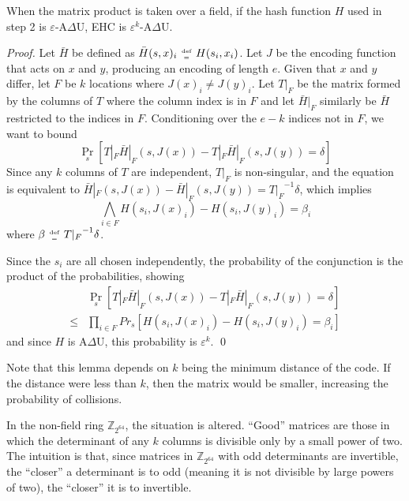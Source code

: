 \documentclass{llncs}
\newcommand{\ints}{\mathbb{Z}}
\newcommand{\defeq}{\;\genfrac{}{}{0pt}{2}{\text{def}}{=}\;}
\begin{document}
\begin{lemma}
  When the matrix product is taken over a field, if the hash function $H$ used in step 2 is $\varepsilon$-A$\Delta$U, EHC is $\varepsilon^k$-A$\Delta$U.
\end{lemma}
\begin{proof}
  Let $\bar{H}$ be defined as $\bar{H}(s, x)_i \defeq H(s_i, x_i)$.
  Let $J$ be the encoding function that acts on $x$ and $y$, producing an encoding of length $e$.
  Given that $x$ and $y$ differ, let $F$ be $k$ locations where $J(x)_i \neq J(y)_i$.
  Let $T|_F$ be the matrix formed by the columns of $T$ where the column index is in $F$ and let $\bar{H}|_F$ similarly be $\bar{H}$ restricted to the indices in $F$.
  Conditioning over the $e - k$ indices not in $F$, we want to bound
  \begin{equation}
    \label{ehc-delta}
    \Pr_s[T|_F \bar{H}|_F(s, J(x)) - T|_F \bar{H}|_F(s, J(y)) = \delta]
  \end{equation}
  Since any $k$ columns of $T$ are independent, $T|_F$ is non-singular, and the equation is equivalent to $\bar{H}|_F(s, J(x)) - \bar{H}|_F(s, J(y)) = {T|_F}^{-1} \delta$, which implies
  \[
  \bigwedge_{i \in F} H(s_i, J(x)_i) - H(s_i, J(y)_i) = \beta_i
  \]
  where $\beta \defeq {T|_F}^{-1} \delta$.

  Since the $s_i$ are all chosen independently, the probability of the conjunction is the product of the probabilities, showing
  \[
  \begin{array}{rl}
    &  \Pr_s[T|_F \bar{H}|_F (s,J(x)) - T|_F \bar{H}|_F(s,J(y)) = \delta] \\
  \leq &  \prod_{i \in F} Pr_s[H(s_i, J(x)_i) - H(s_i, J(y)_i) = \beta_i]
  \end{array}
  \]
  and since $H$ is A$\Delta$U, this probability is $\varepsilon^k$.  \qed
\end{proof}

Note that this lemma depends on $k$ being the minimum distance of the code.
If the distance were less than $k$, then the matrix would be smaller, increasing the probability of collisions.

In the non-field ring $\ints_{2^{64}}$, the situation is altered.
``Good'' matrices are those in which the determinant of any $k$ columns is divisible only by a small power of two.
The intuition is that, since matrices in $\ints_{2^{64}}$ with odd determinants are invertible, the ``closer'' a determinant is to odd (meaning it is not divisible by large powers of two), the ``closer'' it is to invertible.
\end{document}
